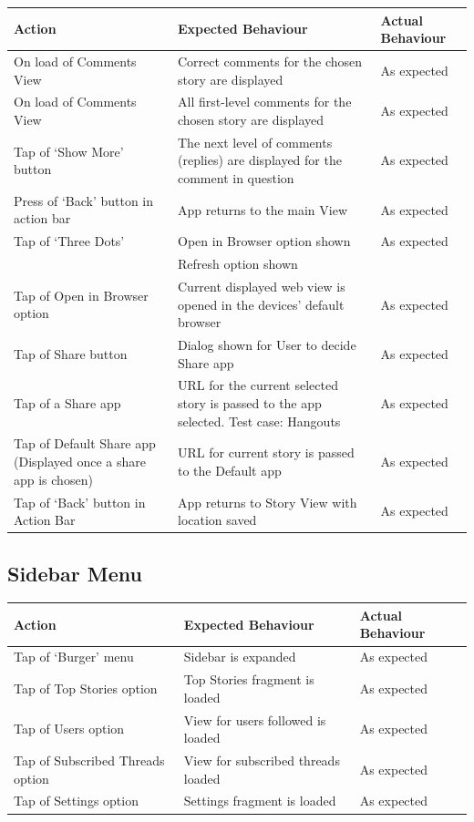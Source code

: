 \documentclass[11pt]{article}
\begin{document}
\begin{center}
\begin{tabular}{ | p{5cm} | p{5cm} | p{5cm} |}
	\hline
	\textbf{Action} & \textbf{Expected Behaviour} & \textbf{Actual Behaviour} \\
	\hline
	On load of Comments View & Correct comments for the chosen story are displayed & As expected \\
	\hline
	On load of Comments View & All first-level comments for the chosen story are displayed & As expected \\
	\hline
	Tap of ‘Show More' button & The next level of comments (replies) are displayed for the comment in question & As expected \\
	\hline
	Press of ‘Back' button in action bar & App returns to the main View & As expected \\
	\hline
	Tap of ‘Three Dots' & Open in Browser option shown & As expected \\ & Refresh option shown & \\
	\hline
	Tap of Open in Browser option & Current displayed web view is opened in the devices' default browser & As expected \\
	\hline
	Tap of Share button & Dialog shown for User to decide Share app & As expected \\
	\hline
	Tap of a Share app & URL for the current selected story is passed to the app selected. Test case: Hangouts & As expected \\
	\hline
	Tap of Default Share app (Displayed once a share app is chosen) & URL for current story is passed to the Default app & As expected \\
	\hline
	Tap of ‘Back' button in Action Bar & App returns to Story View with location saved & As expected \\
	\hline
\end{tabular}
\end{center}

\subsection*{Sidebar Menu}
\begin{center}
\begin{tabular}{ | p{5cm} | p{5cm} | p{5cm} |}
	\hline
	\textbf{Action} & \textbf{Expected Behaviour} & \textbf{Actual Behaviour} \\
	\hline
	Tap of ‘Burger' menu & Sidebar is expanded & As expected \\
	\hline
	Tap of Top Stories option & Top Stories fragment is loaded & As expected \\
	\hline
	Tap of Users option & View for users followed is loaded & As expected \\
	\hline
	Tap of Subscribed Threads option & View for subscribed threads loaded & As expected \\
	\hline
	Tap of Settings option & Settings fragment is loaded & As expected \\
	\hline
\end{tabular}
\end{center}
\end{document}
